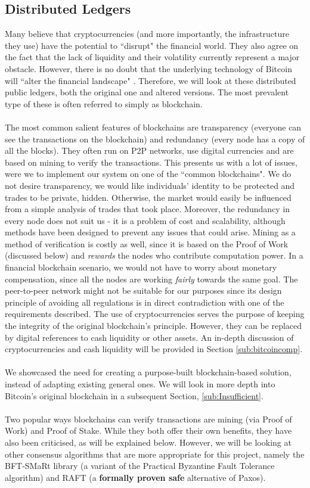 \documentclass[12pt,twoside]{article}
\begin{document}
\subsection{Distributed Ledgers}
\label{sub:DistributedLedgers}
Many believe that cryptocurrencies (and more importantly, the infrastructure they use) have the potential to ``disrupt" the financial world. They also agree on the fact that the lack of liquidity and their volatility currently represent a major obstacle. However, there is no doubt that the underlying technology of Bitcoin will ``alter the financial landscape" \cite{CMM:RN}. Therefore, we will look at these distributed public ledgers, both the original one and altered versions. The most prevalent type of these is often referred to simply as blockchain.
\\ \\
The most common salient features of blockchains are transparency (everyone can see the transactions on the blockchain) and redundancy (every node has a copy of all the blocks). They often run on P2P networks, use digital currencies and are based on mining to verify the transactions. This presents us with a lot of issues, were we to implement our system on one of the ``common blockchains". We do not desire transparency, we would like individuals' identity to be protected and trades to be private, hidden. Otherwise, the market would easily be influenced from a simple analysis of trades that took place. Moreover, the redundancy in every node does not suit us - it is a problem of cost and scalability, although methods have been designed to prevent any issues that could arise. Mining as a method of verification is costly as well, since it is based on the Proof of Work (discussed below) and \textit{rewards} the nodes who contribute computation power. In a financial blockchain scenario, we would not have to worry about monetary compensation, since all the nodes are working \textit{fairly} towards the same goal. The peer-to-peer network might not be suitable for our purposes since its design principle of avoiding all regulations is in direct contradiction with one of the requirements described. The use of cryptocurrencies serves the purpose of keeping the integrity of the original blockchain's principle. However, they can be replaced by digital references to cash liquidity or other assets. An in-depth discussion of cryptocurrencies and cash liquidity will be provided in Section \ref{sub:bitcoincomp}.
\\ \\
We showcased the need for creating a purpose-built blockchain-based solution, instead of adapting existing general ones. We will look in more depth into Bitcoin's original blockchain in a subsequent Section, \ref{sub:Insufficient}.
\\ \\
Two popular ways blockchains can verify transactions are mining (via Proof of Work) and Proof of Stake. While they both offer their own benefits, they have also been criticised, as will be explained below. However, we will be looking at other consensus algorithms that are more appropriate for this project, namely the BFT-SMaRt library (a variant of the Practical Byzantine Fault Tolerance algorithm) and RAFT (a \textbf{formally proven safe} alternative of Paxos).
\end{document}

